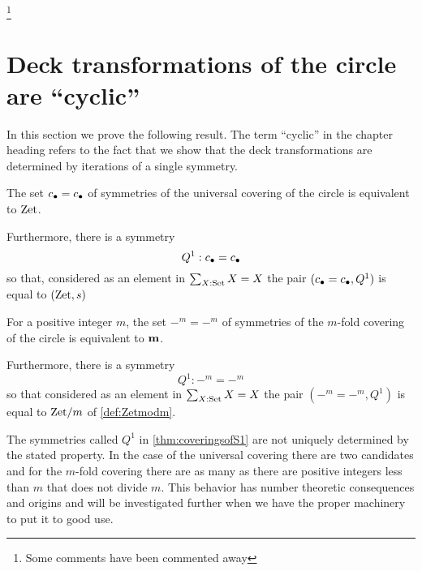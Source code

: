 

\footnote{Some comments have been commented away}

\section{Deck transformations of the circle are ``cyclic'' }
\label{sec:deckS1}

In this section we prove the following result.  The term ``cyclic'' in the chapter heading refers to the fact that we show that the deck transformations are determined by iterations of a single symmetry.  
\begin{theorem}
  \label{thm:coveringsofS1}
  The set $c_\bullet=c_\bullet$ of symmetries of the universal covering of the circle is equivalent to $\mathrm{Zet}$.  

Furthermore, there is a symmetry $$Q^1:c_\bullet=c_\bullet$$ so that, considered as an element in $\sum_{X:\mathord{\mathrm{Set}}}X=X$ the pair $(c_\bullet=c_\bullet,Q^1)$ is equal to $(\mathrm{Zet},s)$
  
For a positive integer $m$, the set $-^m=-^m$ of symmetries of the $m$-fold covering of the circle is equivalent to $\mathbf{m}$.  

Furthermore, there is a symmetry $$Q^1:-^m=-^m$$ so that considered as an element in $\sum_{X:\mathord{\mathrm{Set}}}X=X$ the pair $(-^m=-^m,Q^1)$ is equal to $\mathrm{Zet}/m$ of \cref{def:Zetmodm}.
 \end{theorem}
\begin{remark}\label{rem:thenonuniquenessofgeneratorsofmodulararithmetic1}
  The symmetries called $Q^1$ in \cref{thm:coveringsofS1} are not uniquely determined by the stated property.  
In the case of the universal covering there are two candidates and for the $m$-fold covering there are as many as there are positive integers less than $m$ that does not divide $m$.  
This behavior has number theoretic consequences and origins and will be investigated further when we have the proper machinery to put it to good use.
\end{remark}


